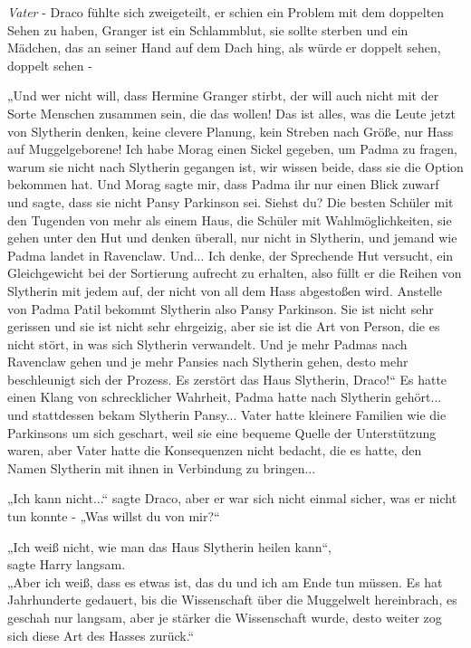 {\emph{Vater} - Draco fühlte sich zweigeteilt, er schien ein Problem mit dem doppelten Sehen zu haben, Granger ist ein Schlammblut, sie sollte sterben und ein Mädchen, das an seiner Hand auf dem Dach hing, als würde er doppelt sehen, doppelt sehen -

„Und wer nicht will, dass Hermine Granger stirbt, der will auch nicht mit der Sorte Menschen zusammen sein, die das wollen! Das ist alles, was die Leute jetzt von Slytherin denken, keine clevere Planung, kein Streben nach Größe, nur Hass auf Muggelgeborene! Ich habe Morag einen Sickel gegeben, um Padma zu fragen, warum sie nicht nach Slytherin gegangen ist, wir wissen beide, dass sie die Option bekommen hat. Und Morag sagte mir, dass Padma ihr nur einen Blick zuwarf und sagte, dass sie nicht Pansy Parkinson sei. Siehst du? Die besten Schüler mit den Tugenden von mehr als einem Haus, die Schüler mit Wahlmöglichkeiten, sie gehen unter den Hut und denken überall, nur nicht in Slytherin, und jemand wie Padma landet in Ravenclaw. Und... Ich denke, der Sprechende Hut versucht, ein Gleichgewicht bei der Sortierung aufrecht zu erhalten, also füllt er die Reihen von Slytherin mit jedem auf, der nicht von all dem Hass abgestoßen wird. Anstelle von Padma Patil bekommt Slytherin also Pansy Parkinson. Sie ist nicht sehr gerissen und sie ist nicht sehr ehrgeizig, aber sie ist die Art von Person, die es nicht stört, in was sich Slytherin verwandelt. Und je mehr Padmas nach Ravenclaw gehen und je mehr Pansies nach Slytherin gehen, desto mehr beschleunigt sich der Prozess. Es zerstört das Haus Slytherin, Draco!“ Es hatte einen Klang von schrecklicher Wahrheit, Padma hatte nach Slytherin gehört... und stattdessen bekam Slytherin Pansy... Vater hatte kleinere Familien wie die Parkinsons um sich geschart, weil sie eine bequeme Quelle der Unterstützung waren, aber Vater hatte die Konsequenzen nicht bedacht, die es hatte, den Namen Slytherin mit ihnen in Verbindung zu bringen...

„Ich kann nicht...“ sagte Draco, aber er war sich nicht einmal sicher, was er nicht tun konnte - „Was willst du von mir?“

„Ich weiß nicht, wie man das Haus Slytherin heilen kann“,\\ sagte Harry langsam.\\ „Aber ich weiß, dass es etwas ist, das du und ich am Ende tun müssen. Es hat Jahrhunderte gedauert, bis die Wissenschaft über die Muggelwelt hereinbrach, es geschah nur langsam, aber je stärker die Wissenschaft wurde, desto weiter zog sich diese Art des Hasses zurück.“

}
